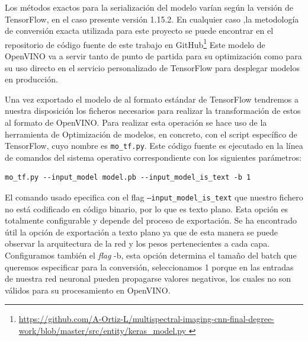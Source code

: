 Los métodos exactos para la serialización del modelo varían según la versión de TensorFlow, en el caso presente versión 1.15.2. En cualquier caso ,la metodología de conversión exacta utilizada
para este proyecto se puede encontrar en el repositorio de código fuente de este trabajo en GitHub\footnote{
    \url{https://github.com/A-Ortiz-L/multispectral-imaging-cnn-final-degree-work/blob/master/src/entity/keras\_model.py
    }}
Este modelo de OpenVINO va a servir tanto de punto de partida para su optimización como para su uso directo en el servicio personalizado de TensorFlow para desplegar modelos en producción.

Una vez exportado el modelo de  al formato estándar de TensorFlow tendremos a nuestra disposición los ficheros necesarios para realizar la transformación de estos al formato de OpenVINO.
Para realizar esta operación se hace uso de la herramienta de Optimización de modelos, en concreto, con el script específico de TensorFlow, cuyo nombre
es \texttt{mo\_tf.py}. Este código fuente es ejecutado en la línea de comandos del sistema operativo correspondiente con los siguientes parámetros:


\begin{lstlisting}[caption=Comando de terminal para convertir un modelo TensorFlow a uno de OpenVINO.,
  label=a_label]
    mo_tf.py --input_model model.pb --input_model_is_text -b 1
\end{lstlisting}

El comando usado epecifica con el flag \texttt{--input\_model\_is\_text} que nuestro fichero no está codificado en código binario, por lo que es texto plano.
Esta opción es totalmente configurable y depende del proceso de exportación.
Se ha encontrado útil la opción de exportación a texto plano ya que de esta manera
se puede observar la arquitectura de la red y los pesos pertenecientes a cada capa.
Configuramos también el \textit{flag} -b, esta opción determina el tamaño del batch que queremos especificar para la conversión, seleccionamos 1 porque en las entradas de nuestra red neuronal pueden propagarse valores
negativos, los cuales no son válidos para su procesamiento en OpenVINO\@.


